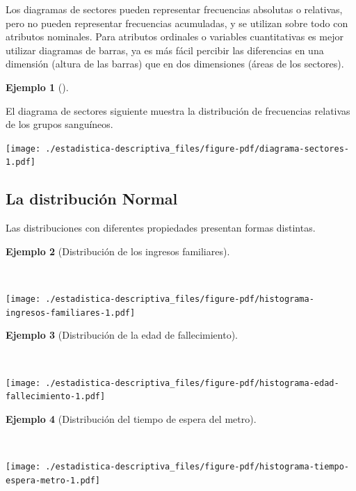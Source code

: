 \documentclass[
  a4paper,
]{scrreport}
\theoremstyle{definition}
\theoremstyle{definition}
\newtheorem{example}{Ejemplo}[chapter]
\theoremstyle{plain}
\theoremstyle{remark}
\begin{document}
Los diagramas de sectores pueden representar frecuencias absolutas o
relativas, pero no pueden representar frecuencias acumuladas, y se
utilizan sobre todo con atributos nominales. Para atributos ordinales o
variables cuantitativas es mejor utilizar diagramas de barras, ya es más
fácil percibir las diferencias en una dimensión (altura de las barras)
que en dos dimensiones (áreas de los sectores).

\leavevmode{}%
\begin{example}[]\label{exm-diagrama-sectores}

El diagrama de sectores siguiente muestra la distribución de frecuencias
relativas de los grupos sanguíneos.

\texttt{[image: ./estadistica-descriptiva\_files/figure-pdf/diagrama-sectores-1.pdf]}

\end{example}

\hypertarget{la-distribuciuxf3n-normal}{%
\subsection{La distribución Normal}\label{la-distribuciuxf3n-normal}}

Las distribuciones con diferentes propiedades presentan formas
distintas.

\leavevmode{}%
\begin{example}[Distribución de los ingresos
familiares]\label{exm-distribucion-ingresos-familiares}

~

\texttt{[image: ./estadistica-descriptiva\_files/figure-pdf/histograma-ingresos-familiares-1.pdf]}

\end{example}

\leavevmode{}%
\begin{example}[Distribución de la edad de
fallecimiento]\label{exm-distribucion-edad-fallecimiento}

~

\texttt{[image: ./estadistica-descriptiva\_files/figure-pdf/histograma-edad-fallecimiento-1.pdf]}

\end{example}

\leavevmode{}%
\begin{example}[Distribución del tiempo de espera del
metro]\label{exm-distribucion-tiempo-espera-metro}

~

\texttt{[image: ./estadistica-descriptiva\_files/figure-pdf/histograma-tiempo-espera-metro-1.pdf]}

\end{example}
\end{document}
